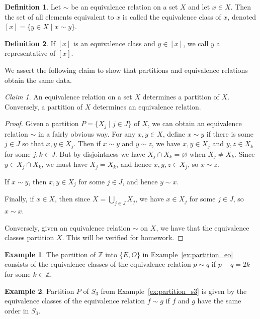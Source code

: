 \documentclass[12pt,letterpaper,DIV=11,final]{scrartcl}
\theoremstyle{plain}
\theoremstyle{definition}
\newtheorem{definition}{Definition}[section]
\newtheorem{example}{Example}[section]
\theoremstyle{remark}
\newtheorem{claim}{Claim}
\begin{document}
\begin{definition}
  Let $\sim$ be an equivalence relation on a set $X$ and let $x \in X$.
  Then the set of all elements equivalent to $x$ is called the equivalence class of $x$, denoted $[x] = \{ y \in X \mid x \sim y \}$.
\end{definition}

\begin{definition}
  If $[x]$ is an equivalence class and $y \in [x]$, we call $y$ a representative of $[x]$.
\end{definition}

We assert the following claim to show that partitions and equivalence relations obtain the same data.

\begin{claim}\label{claim:equivrelation_partition}
  An equivalence relation on a set $X$ determines a partition of $X$.
  Conversely, a partition of $X$ determines an equivalence relation.

  \begin{proof}
    Given a partition $P = \{ X_j \mid j \in J \}$ of $X$, we can obtain an equivalence relation $\sim$ in a fairly obvious way.
    For any $x, y \in X$, define $x \sim y$ if there is some $j \in J$ so that $x, y \in X_j$.
    Then if $x \sim y$ and $y \sim z$, we have $x, y \in X_j$ and $y, z \in X_k$ for some $j, k \in J$.
    But by disjointness we have $X_j \cap X_k = \varnothing$ when $X_j \neq X_k$.
    Since $y \in X_j \cap X_k$, we must have $X_j = X_k$, and hence $x, y, z \in X_j$, so $x \sim z$.

    If $x \sim y$, then $x, y \in X_j$ for some $j \in J$, and hence $y \sim x$.

    Finally, if $x \in X$, then since $X = \bigcup_{j \in J} X_j$, we have $x \in X_j$ for some $j \in J$, so $x \sim x$.

    Conversely, given an equivalence relation $\sim$ on $X$, we have that the equivalence classes partition $X$.
    This will be verified for homework.
  \end{proof}
\end{claim}

\begin{example}
  The partition of $\mathbb{Z}$ into $\{ E, O \}$ in Example~\ref{ex:partition_eo} consists of the equivalence classes of the equivalence relation $p \sim q$ if $p - q = 2k$ for some $k \in \mathbb{Z}$.
\end{example}

\begin{example}
  Partition $P$ of $S_3$ from Example~\ref{ex:partition_s3} is given by the equivalence classes of the equivalence relation $f \sim g$ if $f$ and $g$ have the same order in $S_3$.
\end{example}
\end{document}
